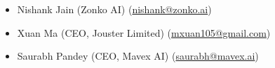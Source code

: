 \begin{itemize}
    \item Nishank Jain (Zonko AI) (\href{mailto:nishank@zonko.ai}{nishank@zonko.ai})
    \item Xuan Ma (CEO, Jouster Limited) (\href{mailto:mxuan105@gmail.com}{mxuan105@gmail.com})
    \item Saurabh Pandey (CEO, Mavex AI) (\href{mailto:saurabh@mavex.ai}{saurabh@mavex.ai})
\end{itemize}

